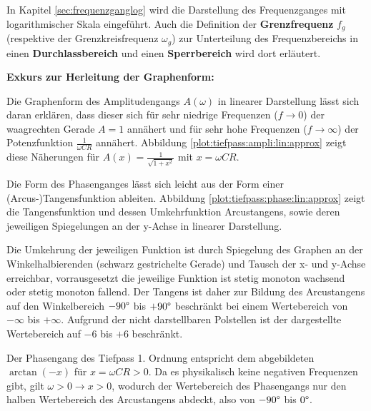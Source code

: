 \begin{frame}[t]
{    %
    In Kapitel \ref{sec:frequenzganglog} wird die Darstellung des Frequenzganges mit logarithmischer Skala eingeführt.
    Auch die Definition der \textbf{Grenzfrequenz} $f_g$ (respektive der Grenzkreisfrequenz $\omega_g$) zur Unterteilung 
    des Frequenzbereichs in einen \textbf{Durchlassbereich} und einen \textbf{Sperrbereich} wird dort erläutert.

    \textbf{Exkurs zur Herleitung der Graphenform:}

    Die Graphenform des Amplitudengangs $A(\omega)$  in linearer Darstellung lässt sich daran erklären, dass dieser sich 
    für sehr niedrige Frequenzen ($f \rightarrow 0$) der waagrechten Gerade $A=1$ annähert und 
    für sehr hohe Frequenzen ($f \rightarrow \infty$) der Potenzfunktion $\frac{1}{\omega CR}$ annähert.
    Abbildung \ref{plot:tiefpass:ampli:lin:approx} zeigt diese Näherungen für $A(x)=\frac{1}{\sqrt{1+x^2}}$ mit $x=\omega CR$.


    Die Form des Phasenganges lässt sich leicht aus der Form einer (Arcus-)Tangensfunktion ableiten.
    Abbildung \ref{plot:tiefpass:phase:lin:approx} zeigt die Tangensfunktion und dessen Umkehrfunktion Arcustangens, sowie deren 
    jeweiligen Spiegelungen an der y-Achse in linearer Darstellung.
    

    Die Umkehrung der jeweiligen Funktion ist durch Spiegelung des Graphen an der Winkelhalbierenden 
    (schwarz gestrichelte Gerade) und Tausch der x- und y-Achse erreichbar,
    vorrausgesetzt die jeweilige Funktion ist stetig monoton wachsend oder stetig monoton fallend. 
    Der Tangens ist daher zur Bildung des Arcustangens auf den Winkelbereich $-90\degree$ bis $+90\degree$ beschränkt 
    bei einem Wertebereich von $-\infty$ bis $+\infty$.
    Aufgrund der nicht darstellbaren Polstellen ist der dargestellte Wertebereich auf $-6$ bis $+6$ beschränkt.

    Der Phasengang des Tiefpass 1. Ordnung entspricht dem abgebildeten $\arctan(-x)$ für $x=\omega CR >0$. 
    Da es physikalisch keine negativen Frequenzen gibt, gilt $\omega>0 \rightarrow x>0$, wodurch der Wertebereich des Phasengangs 
    nur den halben Wertebereich des Arcustangens abdeckt, also von $-90\degree$ bis $0\degree$.
}%
\end{frame}

